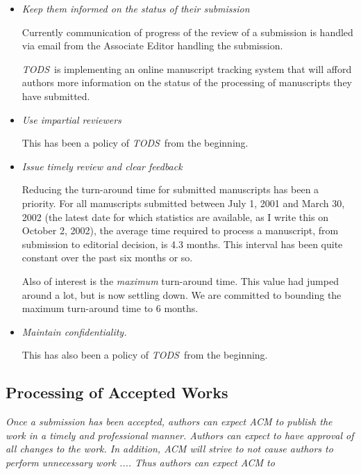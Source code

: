 \documentclass{article}
\newcommand{\tods}{{\em TODS\/}}
\begin{document}
\begin{itemize}
\item {\em Keep them informed on the status of their submission}

  Currently communication of progress of the review of a submission is
  handled via email from the Associate Editor handling the submission.

  \tods\ is implementing an online manuscript tracking system that will
  afford authors more information on the status of the processing of
  manuscripts they have submitted. 

\item {\em Use impartial reviewers}

  This has been a policy of \tods\ from the beginning.

\item {\em Issue timely review and clear feedback}

  Reducing the turn-around time for submitted manuscripts has been a priority.
  For all manuscripts
  submitted between July 1, 2001 and March 30, 2002 (the latest date for
  which statistics are available, as I write this on October 2, 2002), the
  average time required to process a manuscript, from submission to
  editorial decision, is 4.3 months. This interval
  has been quite constant over the past six months or so.

  Also of interest is the {\em maximum} turn-around time. This value had jumped
  around a lot, but is now settling down. We are committed to bounding the
  maximum turn-around time to 6 months.

\item {\em Maintain confidentiality.}

  This has also been a policy of \tods\ from the beginning.

\end{itemize}

\subsection{Processing of Accepted Works}

\noindent
{\em Once a submission has been accepted, authors can expect ACM to publish the
work in a timely and professional manner. Authors can expect to have
approval of all changes to the work. In addition, ACM will strive to not
cause authors to perform unnecessary work .... Thus authors can expect ACM to}
\end{document}
